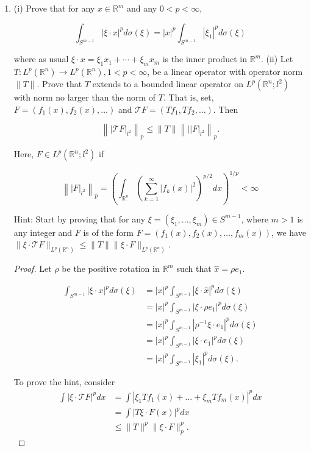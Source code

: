 \begin{enumerate}
\item 
	(i) Prove that for any $x \in \mathbb{R}^m$ and any $0<p<\infty$,

\[
\int_{S^{m-1}}|\xi \cdot x|^p d \sigma(\xi)=|x|^p \int_{S^{m-1}}\left|\xi_1\right|^p d \sigma(\xi)
\]

where as usual $\xi \cdot x=\xi_1 x_1+\cdots+\xi_m x_m$ is the inner product in $\mathbb{R}^m$.
(ii) Let $T: L^p\left(\mathbb{R}^n\right) \rightarrow L^p\left(\mathbb{R}^n\right), 1<p<\infty$, be a linear operator with operator norm $\|T\|$. Prove that $T$ extends to a bounded linear operator on $L^p\left(\mathbb{R}^n ; l^2\right)$ with norm no larger than the norm of $T$. That is, set, $F=\left(f_1(x), f_2(x), \ldots\right)$ and $\mathcal{T} F=\left(T f_1, T f_2, \ldots\right)$. Then

\[
\left\||\mathcal{T} F|_{l^2}\right\|_p \leq\|T\|\left\|\left.| | F\right|_{l^2}\right\|_p .
\]


Here, $F \in L^p\left(\mathbb{R}^n ; l^2\right)$ if

\[
\left\||F|_{l^2}\right\|_p=\left(\int_{\mathbb{R}^n}\left(\sum_{k=1}^{\infty}\left|f_k(x)\right|^2\right)^{p / 2} d x\right)^{1 / p}<\infty
\]


Hint: Start by proving that for any $\xi=\left(\xi_1, \ldots, \xi_m\right) \in S^{m-1}$, where $m>1$ is any integer and $F$ is of the form $F=\left(f_1(x), f_2(x), \ldots, f_m(x)\right)$, we have $\|\xi \cdot \mathcal{T} F\|_{L^p\left(\mathbb{R}^n\right)} \leq\|T\|\|\xi \cdot F\|_{L^p\left(\mathbb{R}^n\right)}$.

\begin{proof}
	Let $\rho$ be the positive rotation in $\mathbb{R}^m$ such that $\hat{x} = \rho e_1$.

	\begin{align*}
		\int _{S^{m - 1}} |\xi \cdot  x|^p d \sigma(\xi)
		&= |x|^p \int _{S^{m - 1}} |\xi \cdot  \hat{x} |^p d \sigma(\xi) \\
		&= |x|^p \int _{S^{m - 1}} |\xi \cdot  \rho e_1 |^p d \sigma(\xi) \\
		&= |x|^p \int _{S^{m - 1}} |\rho^{-1} \xi \cdot  e_1 |^p d \sigma(\xi) \\
		&= |x|^p \int _{S^{m - 1}} |\xi \cdot  e_1 |^p d \sigma(\xi) \\
		&= |x|^p \int _{S^{m - 1}} |\xi_1|^p d \sigma(\xi)
	.\end{align*}

	To prove the hint, consider
	\begin{align*}
		\int \left| \xi \cdot \mathcal{T} F \right| ^p d x
		&= \int |\xi_1 T f_1(x) + \ldots + \xi_m T f_m(x)|^p d x \\
		&= \int |T \xi \cdot  F(x)|^p d x \\
		&\leq \|T\|^p \|\xi \cdot  F\|_p^p
	.\end{align*}


\end{proof}
\end{enumerate}
